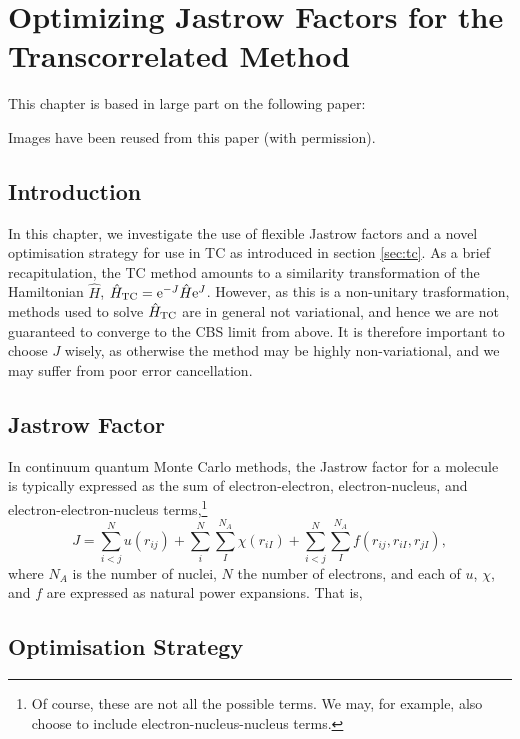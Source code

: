 \chapter{Optimizing Jastrow Factors for the Transcorrelated Method}
  \label{chap:opt}

This chapter is based in large part on the following paper:\\

Images have been reused from this paper (with permission).

\section{Introduction}

In this chapter, we investigate the use of flexible Jastrow factors and a novel optimisation strategy for use in \gls{TC} as introduced in section \ref{sec:tc}. As a brief recapitulation, the TC method amounts to a similarity transformation of the Hamiltonian $\hat H$, $\hat H_\mathrm{TC} = \mathrm{e}^{-J}\hat H\mathrm{e}^J$. However, as this is a non-unitary trasformation, methods used to solve $\hat H_\mathrm{TC}$ are in general not variational, and hence we are not guaranteed to converge to the \gls{CBS} limit from above. It is therefore important to choose $J$ wisely, as otherwise the method may be highly non-variational, and we may suffer from poor error cancellation.


\section{Jastrow Factor}

In continuum quantum Monte Carlo methods, the Jastrow factor for a molecule is typically expressed as the sum of electron-electron, electron-nucleus, and electron-electron-nucleus terms,\footnote{Of course, these are not all the possible terms. We may, for example, also choose to include electron-nucleus-nucleus terms.}
\begin{equation}
    \label{eq:jastrow}
    J = \sum_{i<j}^Nu(r_{ij}) + \sum_i^N\sum_I^{N_A}\chi(r_{iI}) + \sum_{i<j}^N\sum_I^{N_A}f(r_{ij}, r_{iI}, r_{jI}),
\end{equation}
where $N_A$ is the number of nuclei, $N$ the number of electrons, and each of $u$, $\chi$, and $f$ are expressed as natural power expansions. That is,


\section{Optimisation Strategy}

